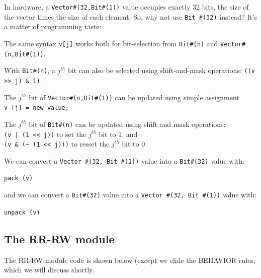 In hardware, a \verb|Vector#(32,Bit#(1))| value occupies exactly 32
bits, {\ie} the size of the vector times the size of each element.
So, why not use \verb|Bit #(32)| instead?  It's a matter of
programming taste:

\begin{tightlist}

  \item The same syntax \verb|v[j]| works both for bit-selection from
        \verb|Bit#(n)| and \verb|Vector#(n,Bit#(1))|.

  \item With \verb|Bit#(n)|, a $j^{th}$ bit can also be selected using
        shift-and-mask operations: \verb|((v >> j) & 1)|.

  \item The $j^{th}$ bit of \verb|Vector#(n,Bit#(1))| can be updated
        using simple assignment \\
	\hmm \verb|v [j] = new_value;|

  \item The $j^{th}$ bit of \verb|Bit#(n)| can be updated using shift
        and mask operations: \\
	\hmm \verb'(v | (1 << j))' to set the $j^{th}$ bit to 1, and \\
	\hmm \verb|(v & (~ (1 << j)))| to resset the $j^{th}$ bit to 0

\end{tightlist}

We can convert a \verb|Vector #(32, Bit #(1))| value into a \verb|Bit#(32)| value with:

\hmm \verb|pack (v)|

and we can convert a \verb|Bit#(32)| value into a \verb|Vector #(32, Bit #(1))| value with:

\hmm \verb|unpack (v)|


\subsection{The RR-RW module}

The RR-RW module code is shown below (except we elide the BEHAVIOR
rules, which we will discuss shortly.

